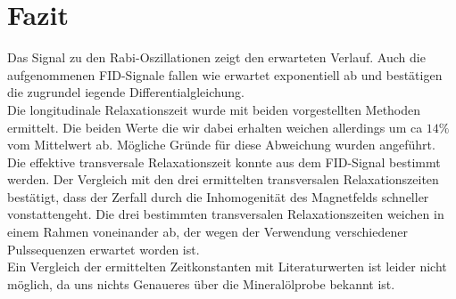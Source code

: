\section{Fazit}
Das Signal zu den Rabi-Oszillationen zeigt den erwarteten Verlauf. Auch die aufgenommenen FID-Signale fallen wie erwartet exponentiell ab und bestätigen die zugrundel iegende Differentialgleichung.\\
Die longitudinale Relaxationszeit wurde mit beiden vorgestellten Methoden ermittelt. Die beiden Werte die wir dabei erhalten weichen allerdings um ca $14\%$ vom Mittelwert ab. Mögliche Gründe für diese Abweichung wurden angeführt.\\
Die effektive transversale Relaxationszeit konnte aus dem FID-Signal bestimmt werden. Der Vergleich mit den drei ermittelten transversalen Relaxationszeiten bestätigt, dass der Zerfall durch die Inhomogenität des Magnetfelds schneller vonstattengeht. Die drei bestimmten transversalen Relaxationszeiten weichen in einem Rahmen voneinander ab, der wegen der Verwendung verschiedener Pulssequenzen erwartet worden ist. \\ 
Ein Vergleich der ermittelten Zeitkonstanten mit Literaturwerten ist leider nicht möglich, da uns nichts Genaueres über die Mineralölprobe bekannt ist.          
